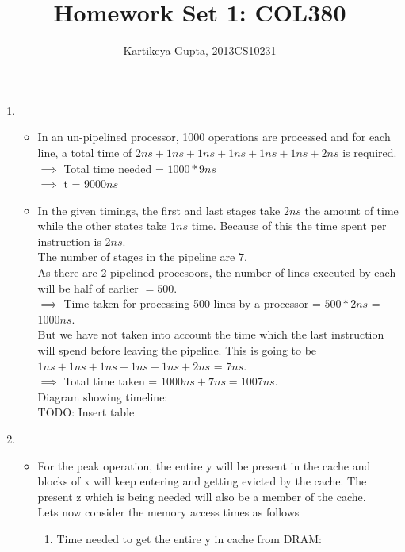 \documentclass[11pt]{article}
\begin{document}
\author{Kartikeya Gupta, 2013CS10231}
\title{Homework Set 1: COL380}
\maketitle

\begin{enumerate}
\item %
	\begin{itemize}
		\item In an un-pipelined processor, 1000 operations are processed and for each line, a total time of $2ns + 1ns + 1ns + 1ns + 1ns + 1ns + 2ns$ is required. \\
				$\implies$ Total time needed = $1000 * 9ns$ \\
				$\implies$ t = $9000ns$
		\item In the given timings, the first and last stages take $2ns$ the amount of time while the other states take $1ns$ time. Because of this the time spent per instruction is $2ns$.\\
			The number of stages in the pipeline are $7$. \\
			As there are 2 pipelined procesoors, the number of lines executed by each will be half of earlier $ =500$. \\
			$\implies$ Time taken for processing 500 lines by a processor = $500*2ns$ = $ 1000ns$. \\
			But we have not taken into account the time which the last instruction will spend before leaving the pipeline. This is going to be $1ns+1ns+1ns+1ns+1ns+2ns$ = $7ns$. \\
			\vspace{0.1in}
			$\implies$ Total time taken = $1000ns+7ns = 1007ns$.
			\\
			Diagram showing timeline: \\
			TODO: Insert table
	\end{itemize}
\item %
	\begin{itemize}
			\item For the peak operation, the entire y will be present in the cache and blocks of x will keep entering and getting evicted by the cache. The present z which is being needed will also be a member of the cache.\\
				Lets now consider the memory access times as follows\\
				\begin{enumerate}
					\item Time needed to get the entire y in cache from DRAM: \\

\end{enumerate}
\end{itemize}
\end{enumerate}
\end{document}

